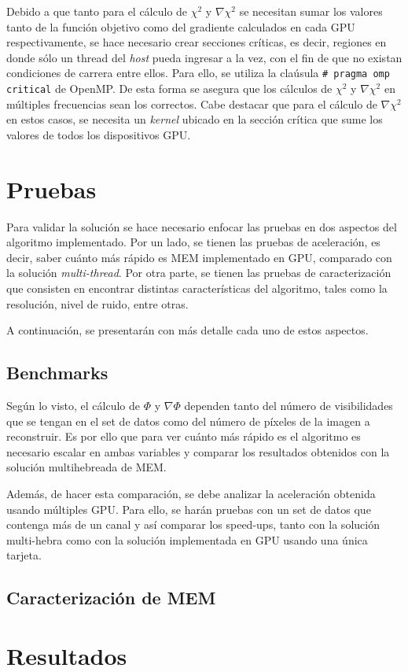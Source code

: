Debido a que tanto para el cálculo de $\chi^{2}$ y $\nabla \chi^{2}$ se necesitan sumar los valores tanto de la función objetivo como del gradiente calculados en cada GPU respectivamente, se hace necesario crear  secciones críticas, es decir, regiones en donde sólo un thread del \textit{host} pueda ingresar a la vez, con el fin de que no existan condiciones de carrera entre ellos. Para ello, se utiliza la claúsula \texttt{\# pragma omp critical} de OpenMP. De esta forma se asegura que los cálculos de $\chi^{2}$ y $\nabla \chi^{2}$ en múltiples frecuencias sean los correctos. Cabe destacar que para el cálculo de $\nabla \chi^{2}$ en estos casos, se necesita un \textit{kernel} ubicado en la sección crítica que sume los valores de todos los dispositivos GPU. 



\chapter{Pruebas}
\label{cap:pruebas}

Para validar la solución se hace necesario enfocar las pruebas en dos aspectos del algoritmo implementado. Por un lado, se tienen las pruebas de aceleración, es decir, saber cuánto más rápido es MEM implementado en GPU, comparado con la solución \textit{multi-thread}. Por otra parte, se tienen las pruebas de caracterización que consisten en encontrar distintas características del algoritmo, tales como la resolución, nivel de ruido, entre otras.

A continuación, se presentarán con más detalle cada uno de estos aspectos.

\section{Benchmarks}
Según lo visto, el cálculo de $\Phi$ y $\nabla \Phi$ dependen tanto del número de visibilidades que se tengan en el set de datos como del número de píxeles de la imagen a reconstruir. Es por ello que para ver cuánto más rápido es el algoritmo es necesario escalar en ambas variables y comparar los resultados obtenidos con la solución multihebreada de MEM.

Además, de hacer esta comparación, se debe analizar la aceleración obtenida usando múltiples GPU. Para ello, se harán pruebas con un set de datos que contenga más de un canal y así comparar los speed-ups, tanto con la solución multi-hebra como con la solución implementada en GPU usando una única tarjeta.

\section{Caracterización de MEM}

\chapter{Resultados}
\label{cap:resultados}
